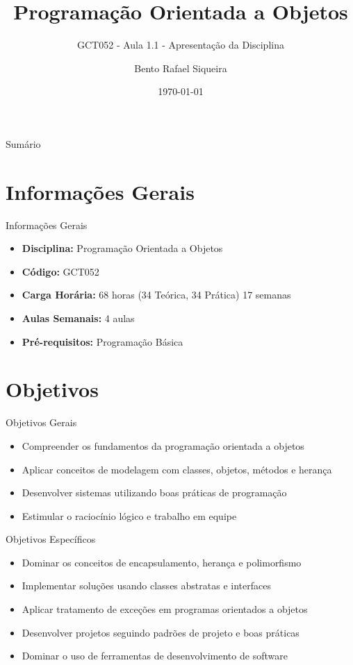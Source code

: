 \documentclass[aspectratio=169]{beamer}
\title{Programação Orientada a Objetos}
\subtitle{GCT052 - Aula 1.1 - Apresentação da Disciplina}
\author{Bento Rafael Siqueira}
\institute{Universidade Federal de Lavras (UFLA)}
\date{\today}
\begin{document}
\begin{frame}
\titlepage
\end{frame}

\begin{frame}{Sumário}
\tableofcontents
\end{frame}

\section{Informações Gerais}

\begin{frame}{Informações Gerais}
\begin{itemize}
    \item \textbf{Disciplina:} Programação Orientada a Objetos
    \item \textbf{Código:} GCT052
    \item \textbf{Carga Horária:} 68 horas (34 Teórica, 34 Prática) 17 semanas
    \item \textbf{Aulas Semanais:} 4 aulas
    \item \textbf{Pré-requisitos:} Programação Básica
\end{itemize}
\end{frame}

\section{Objetivos}

\begin{frame}{Objetivos Gerais}
\begin{itemize}
    \item Compreender os fundamentos da programação orientada a objetos
    \item Aplicar conceitos de modelagem com classes, objetos, métodos e herança
    \item Desenvolver sistemas utilizando boas práticas de programação
    \item Estimular o raciocínio lógico e trabalho em equipe
\end{itemize}
\end{frame}

\begin{frame}{Objetivos Específicos}
\begin{itemize}
    \item Dominar os conceitos de encapsulamento, herança e polimorfismo
    \item Implementar soluções usando classes abstratas e interfaces
    \item Aplicar tratamento de exceções em programas orientados a objetos
    \item Desenvolver projetos seguindo padrões de projeto e boas práticas
    \item Dominar o uso de ferramentas de desenvolvimento de software
\end{itemize}
\end{frame}
\end{document}
